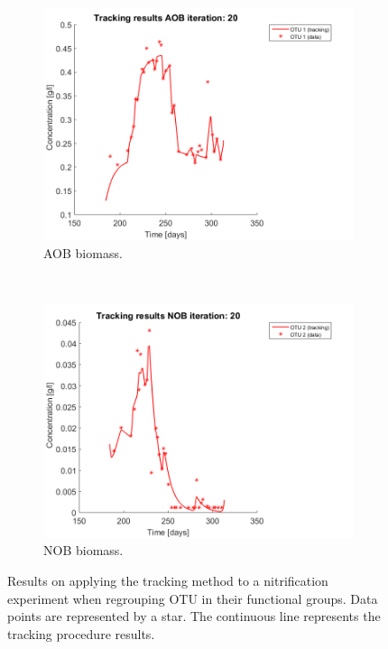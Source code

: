 \documentclass[3p,times]{article}
\begin{document}
\begin{figure}[h]
\begin{subfigure}{0.45 \linewidth}
		\includegraphics[width=\textwidth]{Application/200407_regroup_OTU_try2_iter_20_AOB_plot_1}
		\caption{AOB biomass.}
		\label{AOB application}
	\end{subfigure}
	~
	\begin{subfigure}{0.45 \linewidth}
		\includegraphics[width=\textwidth]{Application/200407_regroup_OTU_try2_iter_20_NOB_plot_1}
		\caption{NOB biomass.}
		\label{NOB application}
	\end{subfigure}
\caption{Results on applying the tracking method to a nitrification experiment when regrouping OTU in their functional groups. Data points are represented by a star. The continuous line represents the tracking procedure results.}
\label{regroup_results}
\end{figure}
\end{document}
